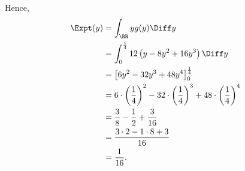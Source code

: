 \begin{enumerate}
          Hence,
          \begin{align*}
              \Expt(y) & = \int_{\RR} y g(y) \Diff y                                                                                      \\
                       & = \int_{0}^{\frac{1}{4}} 12 \left(y - 8y^2 + 16y^3\right) \Diff y                                                \\
                       & = \left[6y^2 - 32y^3 + 48y^4\right]_{0}^{\frac{1}{4}}                                                            \\
                       & = 6 \cdot \left(\frac{1}{4}\right)^2 - 32 \cdot \left(\frac{1}{4}\right)^3 + 48 \cdot \left(\frac{1}{4}\right)^4 \\
                       & = \frac{3}{8} - \frac{1}{2} + \frac{3}{16}                                                                       \\
                       & = \frac{3 \cdot 2 - 1 \cdot 8 + 3}{16}                                                                           \\
                       & = \frac{1}{16}.
          \end{align*}

\end{enumerate}